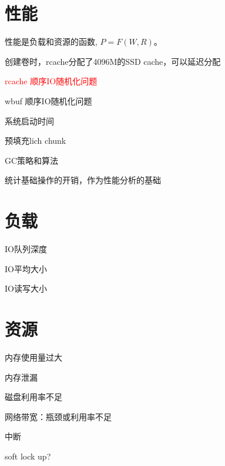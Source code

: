 \section{性能}

性能是负载和资源的函数, $P=F(W, R)$。

\begin{tcolorbox}
\begin{compactenum}
    \item 创建卷时，rcache分配了4096M的SSD cache，可以延迟分配
    \item \textcolor{red}{rcache 顺序IO随机化问题}
    \item wbuf 顺序IO随机化问题
    \item 系统启动时间
    \item 预填充lich chunk
    \item GC策略和算法
    \item 统计基础操作的开销，作为性能分析的基础
\end{compactenum}
\end{tcolorbox}

\section{负载}

\begin{tcolorbox}
\begin{compactenum}
    \item IO队列深度
    \item IO平均大小
    \item IO读写大小
\end{compactenum}
\end{tcolorbox}

\section{资源}

\begin{tcolorbox}
\begin{compactitem}
    \item 内存使用量过大
    \item 内存泄漏
    \item 磁盘利用率不足
    \item 网络带宽：瓶颈或利用率不足
    \item 中断
    \item soft lock up?
\end{compactitem}
\end{tcolorbox}

